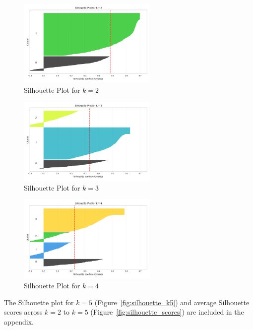 \documentclass{article}
\begin{document}
\begin{figure}[H]
    \centering
    \includegraphics[width=0.6\textwidth]{figures/silhouette_k2.png}
    \caption{Silhouette Plot for $k=2$}
    \label{fig:silhouette_k2}
\end{figure}

\begin{figure}[H]
    \centering
    \includegraphics[width=0.6\textwidth]{figures/silhouette_k3.png}
    \caption{Silhouette Plot for $k=3$}
    \label{fig:silhouette_k3}
\end{figure}

\begin{figure}[H]
    \centering
    \includegraphics[width=0.6\textwidth]{figures/silhouette_k4.png}
    \caption{Silhouette Plot for $k=4$}
    \label{fig:silhouette_k4}
\end{figure}

The Silhouette plot for $k=5$ (Figure~\ref{fig:silhouette_k5}) and average Silhouette scores across $k=2$ to $k=5$ (Figure~\ref{fig:silhouette_scores}) are included in the appendix.
\end{document}
